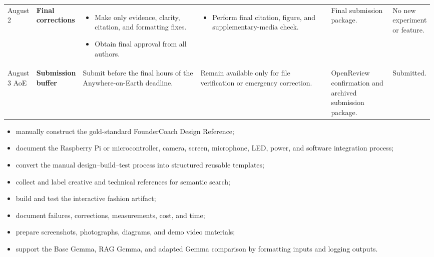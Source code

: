 \documentclass{article}
\begin{document}
\begin{landscape}
\begin{longtable}{
    L{0.05\linewidth}
    L{0.08\linewidth}
    L{0.3\linewidth}
    L{0.33\linewidth}
    L{0.15\linewidth}
    L{0.08\linewidth}
}
August 2
&
\textbf{Final corrections}
&
\begin{itemize}[leftmargin=*,nosep]
    \item Make only evidence, clarity, citation, and formatting fixes.
    \item Obtain final approval from all authors.
\end{itemize}
&
\begin{itemize}[leftmargin=*,nosep]
    \item Perform final citation, figure, and supplementary-media check.
\end{itemize}
&
Final submission package.
&
No new experiment or feature.
\\

August 3 AoE
&
\textbf{Submission buffer}
&
Submit before the final hours of the Anywhere-on-Earth deadline.
&
Remain available only for file verification or emergency correction.
&
OpenReview confirmation and archived submission package.
&
Submitted.
\\

\end{longtable}

\end{landscape}

\begin{itemize}
    \item manually construct the gold-standard FounderCoach Design Reference;
    \item document the Raspberry Pi or microcontroller, camera, screen,
    microphone, LED, power, and software integration process;
    \item convert the manual design--build--test process into structured
    reusable templates;
    \item collect and label creative and technical references for semantic search;
    \item build and test the interactive fashion artifact;
    \item document failures, corrections, measurements, cost, and time;
    \item prepare screenshots, photographs, diagrams, and demo video materials;
    \item support the Base Gemma, RAG Gemma, and adapted Gemma comparison by
    formatting inputs and logging outputs.
\end{itemize}
\end{document}
